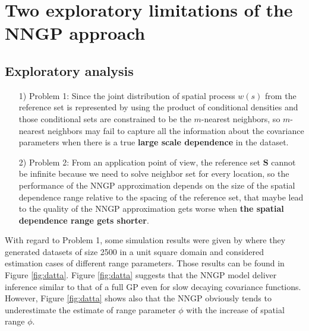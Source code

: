 \documentclass[
12pt, %
a4paper, %
oneside, %
headinclude,footinclude, %
BCOR5mm, %
]{scrartcl}
\begin{document}
\section{Two exploratory limitations of the NNGP approach}
\subsection{Exploratory analysis }
\begin{itemize}
 \item [1)]Problem 1: Since the joint distribution of spatial process $w(s)$ from the reference set is represented by using the product of conditional densities and those conditional sets are constrained to be the $m$-nearest neighbors, so $m$-nearest neighbors may fail to capture all the information about the covariance parameters when there is a true \textbf{large scale dependence} in the dataset.
 \item [2)]Problem 2: From an application point of view, the reference set $\boldsymbol{S}$ cannot be infinite because we need to solve neighbor set for every location, so the performance of the NNGP approximation depends on the size of the spatial dependence range relative to the spacing of the reference set, that maybe lead to the quality of the NNGP approximation gets worse when \textbf{the spatial dependence range gets shorter}.
\end{itemize}

With regard to Problem 1, some simulation results were given by \href{https://chenyw68.github.io/Literature/[2016]Hierarchical nearest-neighbor Gaussian process models for large geostatistical datasets.pdf}{\cite{datta2016hierarchical}} where they generated datasets of size 2500 in a unit square domain and considered estimation cases of different range parameters. Those results can be found in Figure \ref{fig:datta}.  Figure \ref{fig:datta} suggests that the NNGP model deliver inference similar to that of a full GP even for slow decaying covariance functions. However, Figure \ref{fig:datta} shows also that the NNGP obviously tends to underestimate the estimate of range parameter $\phi$ with the increase of spatial range $\phi$.
\end{document}
